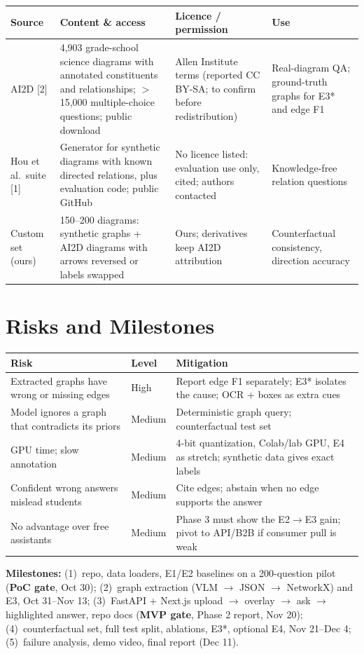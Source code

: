 \documentclass[11pt,letterpaper]{article}
\begin{document}
{\small
\begin{tabularx}{\textwidth}{@{}P{2.5cm}LLL@{}}
\toprule
\textbf{Source} & \textbf{Content \& access} & \textbf{Licence / permission} & \textbf{Use}\\
\midrule
AI2D [2] & 4,903 grade-school science diagrams with annotated constituents and relationships; $>$15,000 multiple-choice questions; public download & Allen Institute terms (reported CC BY-SA; to confirm before redistribution) & Real-diagram QA; ground-truth graphs for E3* and edge F1\\
Hou et al.\ suite [1] & Generator for synthetic diagrams with known directed relations, plus evaluation code; public GitHub & No licence listed: evaluation use only, cited; authors contacted & Knowledge-free relation questions\\
Custom set (ours) & 150--200 diagrams: synthetic graphs + AI2D diagrams with arrows reversed or labels swapped & Ours; derivatives keep AI2D attribution & Counterfactual consistency, direction accuracy\\
\bottomrule
\end{tabularx}}

\section{Risks and Milestones}
{\small
\begin{tabularx}{\textwidth}{@{}P{5.2cm}P{1.5cm}L@{}}
\toprule
\textbf{Risk} & \textbf{Level} & \textbf{Mitigation}\\
\midrule
Extracted graphs have wrong or missing edges & High & Report edge F1 separately; E3* isolates the cause; OCR + boxes as extra cues\\
Model ignores a graph that contradicts its priors & Medium & Deterministic graph query; counterfactual test set\\
GPU time; slow annotation & Medium & 4-bit quantization, Colab/lab GPU, E4 as stretch; synthetic data gives exact labels\\
Confident wrong answers mislead students & Medium & Cite edges; abstain when no edge supports the answer\\
No advantage over free assistants & Medium & Phase 3 must show the E2$\rightarrow$E3 gain; pivot to API/B2B if consumer pull is weak\\
\bottomrule
\end{tabularx}}

\textbf{Milestones:} (1)~repo, data loaders, E1/E2 baselines on a 200-question pilot (\textbf{PoC gate}, Oct 30); (2)~graph extraction (VLM $\rightarrow$ JSON $\rightarrow$ NetworkX) and E3, Oct 31--Nov 13; (3)~FastAPI + Next.js upload $\rightarrow$ overlay $\rightarrow$ ask $\rightarrow$ highlighted answer, repo docs (\textbf{MVP gate}, Phase 2 report, Nov 20); (4)~counterfactual set, full test split, ablations, E3*, optional E4, Nov 21--Dec 4; (5)~failure analysis, demo video, final report (Dec 11).
\end{document}
